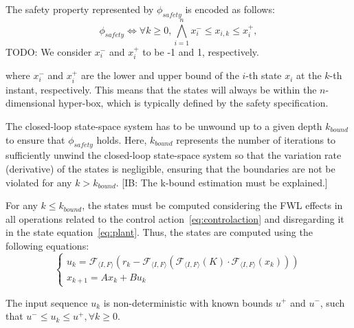 \documentclass[runningheads,a4paper]{llncs}
\newcommand{\todo}[1]{{\color{red} TODO: #1}}
\newcommand{\commentib}[1]{{\color{blue} [IB: #1]}}
\begin{document}
The safety property represented by $\phi_{safety}$ is encoded as follows:
%
\begin{equation}
\label{eq:safetyliteral}
\phi_{safety}\iff \forall k\geq 0, \bigwedge_{i=1}^{n}{x_{i}^{-} \leq x_{i,k} \leq x_{i}^{+}},
\end{equation}
%
\todo{We consider $x_{i}^{-}$ and $x_{i}^{+}$ to be -1 and 1, respectively.}

where $x_{i}^{-}$ and $x_{i}^{+}$ are the lower and upper bound 
of the $i$-th state $x_{i}$ at the $k$-th instant, respectively.
This means that the states will always be within the $n$-dimensional 
hyper-box, which is typically defined by the safety specification.

The closed-loop state-space system has to be unwound up to a given 
depth $k_{bound}$ to ensure that $\phi_{safety}$ holds. 
Here, $k_{bound}$ represents the number of iterations 
to sufficiently unwind the closed-loop state-space system 
so that the variation rate (derivative) of the states is negligible, 
ensuring that the boundaries are not be violated for any $k>k_{bound}$. 
\commentib{The k-bound estimation must be explained.}

For any $k\leq k_{bound}$, the states must be computed considering 
the FWL effects in all operations related to the control action~\eqref{eq:controlaction} 
and disregarding it in the state equation~\eqref{eq:plant}. 
Thus, the states are computed using the following equations:
%
\begin{equation}
\label{eq:ssunroll}
\left\lbrace
\begin{array}{l}
u_{k}=\mathcal{F}_{\langle I,F \rangle}(r_{k}-\mathcal{F}_{\langle I,F \rangle}(\mathcal{F}_{\langle I,F \rangle}(K)\cdot\mathcal{F}_{\langle I,F \rangle}(x_{k})))\\
x_{k+1}=Ax_{k}+Bu_{k}
\end{array}\right.
\end{equation}

The input sequence $u_{k}$ is non-deterministic with known bounds $u^{+}$ and $u^{-}$, such that ${u^{-} \leq u_{k} \leq u^{+}},\forall k\geq 0$. 

\end{document}
